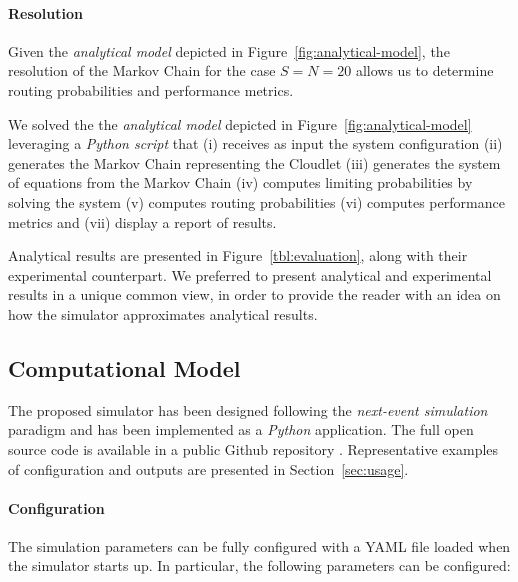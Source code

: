 \paragraph{Resolution}
Given the \textit{analytical model} depicted in Figure~\ref{fig:analytical-model}, the resolution of the Markov Chain for the case $S=N=20$ allows us to determine routing probabilities and performance metrics.

We solved the the \textit{analytical model} depicted in Figure~\ref{fig:analytical-model} leveraging a \textit{Python script} that 
(i) receives as input the system configuration
(ii) generates the Markov Chain representing the Cloudlet
(iii) generates the system of equations from the Markov Chain
(iv) computes limiting probabilities by solving the system
(v) computes routing probabilities
(vi) computes performance metrics and
(vii) display a report of results.

Analytical results are presented in Figure~\ref{tbl:evaluation}, along with their experimental counterpart.
%
We preferred to present analytical and experimental results in a unique common view, in order to provide the reader with an idea on how the simulator approximates analytical results.





\subsection{Computational Model}
The proposed simulator has been designed following the \textit{next-event simulation} paradigm and has been implemented as a \textit{Python} application. The full open source code is available in a public Github repository \cite{gmarciani-pydes}.
Representative examples of configuration and outputs are presented in Section~\ref{sec:usage}.

\paragraph{Configuration}
The simulation parameters can be fully configured with a YAML file loaded when the simulator starts up. In particular, the following parameters can be configured:

